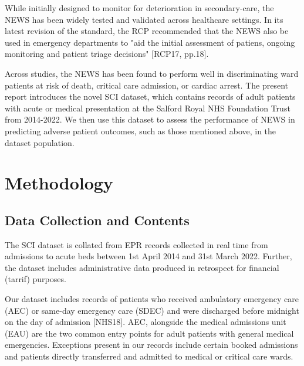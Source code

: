 \documentclass[10pt,journal, compsoc]{IEEEtran}
\begin{document}
While initially designed to monitor for deterioration in secondary-care, the NEWS has been widely tested and validated across healthcare settings. In its latest revision of the standard, the RCP recommended that the NEWS also be used in emergency departments to "aid the initial assessment of patiens, ongoing monitoring and patient triage decisions" [RCP17, pp.18].

Across studies, the NEWS has been found to perform well in discriminating ward patients at risk of death, critical care admission, or cardiac arrest. The present report introduces the novel SCI dataset, which contains records of adult patients with acute or medical presentation at the Salford Royal NHS Foundation Trust from 2014-2022. We then use this dataset to assess the performance of NEWS in predicting adverse patient outcomes, such as those mentioned above, in the dataset population.

\section{Methodology}
\subsection{Data Collection and Contents}
The SCI dataset is collated from EPR records collected in real time from admissions to acute beds between 1st April 2014 and 31st March 2022. Further, the dataset includes administrative data produced in retrospect for financial (tarrif) purposes.

Our dataset includes records of patients who received ambulatory emergency care (AEC) or same-day emergency care (SDEC) and were discharged before midnight on the day of admission [NHS18]. AEC, alongside the medical admissions unit (EAU)  are the two common entry points for adult patients with general medical emergencies. Exceptions present in our records include certain booked admissions and patients directly transferred and admitted to medical or critical care wards.
\end{document}
